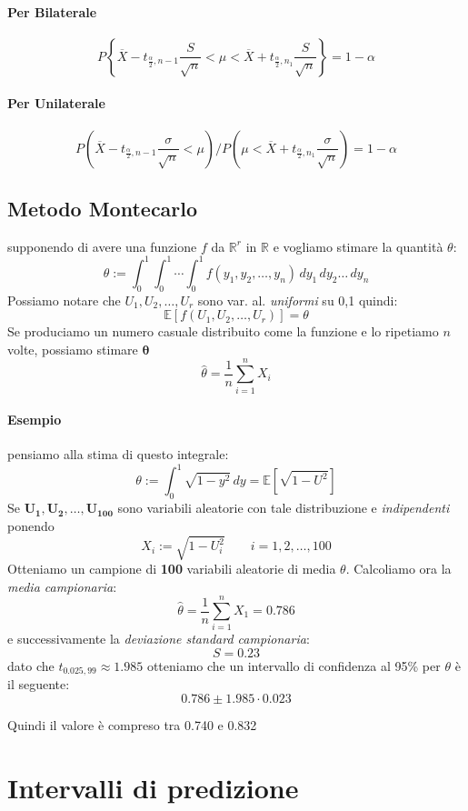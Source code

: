 \documentclass[]{article}
\newcommand{\ev}{\mathbb{E}[X]}
\renewcommand{\ev}[1]{\mathbb{E}\left[#1\right]}
\begin{document}
    \paragraph{Per Bilaterale}
    \[ P \left\{ \overline{X} - t_{\frac{\alpha}{2}, n-1} \frac{S}{\sqrt{n}} < \mu < \overline{X} + t_{\frac{\alpha}{2}, n_1} \frac{S}{\sqrt{n}} \right\} = 1 - \alpha \]
    \paragraph{Per Unilaterale}
    \[ P \left(  \overline{X} - t_{\frac{\alpha}{2}, n-1} \frac{\sigma}{\sqrt{n}} < \mu \right) / P \left( \mu < \overline{X} + t_{\frac{\alpha}{2}, n_1} \frac{\sigma}{\sqrt{n}}\right) = 1 - \alpha  \]
    \subsection{Metodo Montecarlo}
    supponendo di avere una funzione $f$ da $\mathbb{R}^r$ in $\mathbb{R}$ e vogliamo stimare la quantità $\theta$:
    \[ \theta := \int_{0}^{1} \int_{0}^{1} \cdots \int_{0}^{1} f(y_1, y_2, \ldots, y_n) \, dy_1 \, dy_2 \ldots \, dy_n \]
    Possiamo notare che $U_1, U_2, \ldots, U_r$ sono var. al. \textit{uniformi} su 0,1 quindi:
    \[ \ev{f(U_1, U_2, \ldots, U_r)} = \theta \]
    Se produciamo un numero casuale distribuito come la funzione e lo ripetiamo $n$ volte, possiamo stimare $\boldsymbol{\theta}$
    \[ \hat{\theta} = \frac{1}{n} \sum_{i = 1}^{n} X_i \]
    \paragraph{Esempio} pensiamo alla stima di questo integrale:
    \[ \theta := \int_{0}^{1} \sqrt{1 - y^2} \, dy = \ev{\sqrt{1-U^2}} \]
    Se $\boldsymbol{U_1, U_2, \ldots, U_{100}}$ sono variabili aleatorie con tale distribuzione e \textit{indipendenti} ponendo 
    \[ X_i := \sqrt{1-U^2_i} \qquad i = 1,2, \ldots, 100 \]
    Otteniamo un campione di \textbf{100} variabili aleatorie di media $\theta$. Calcoliamo ora la \textit{media campionaria}:
    \[ \hat{\theta} = \frac{1}{n} \sum_{i=1}^{n} X_1 = 0.786 \]
    e successivamente la \textit{deviazione standard campionaria}:
    \[ S = 0.23 \]
    dato che $t_{0.025, 99} \approx 1.985$ otteniamo che un intervallo di confidenza al 95\% per $\theta$ è il seguente:
    \[ 0.786 \pm 1.985 \cdot 0.023 \]
    \centerline{Quindi il valore è compreso tra 0.740 e 0.832}
    \section{Intervalli di predizione}
\end{document}
